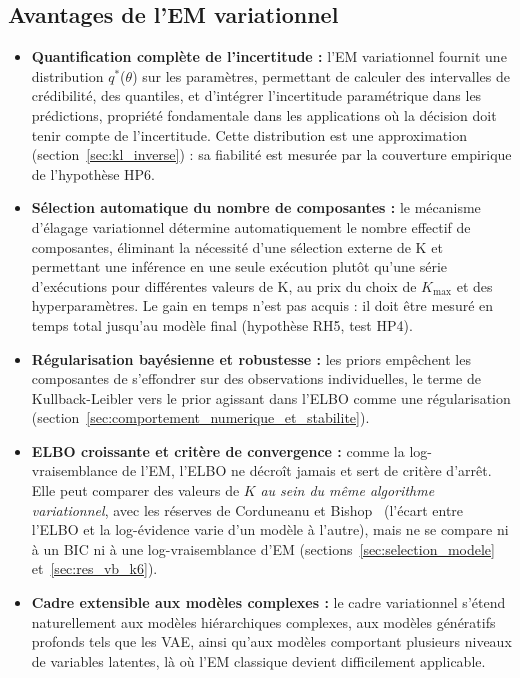 \subsection{Avantages de l'EM variationnel}\label{sec:avantages_de_l_em_variationnel}
\begin{itemize}
\item \textbf{Quantification complète de l'incertitude : }l'EM variationnel fournit une distribution $q^{*}$($\theta $) sur les paramètres, permettant de calculer des intervalles de crédibilité, des quantiles, et d'intégrer l'incertitude paramétrique dans les prédictions, propriété fondamentale dans les applications où la décision doit tenir compte de l'incertitude. Cette distribution est une approximation (section~\ref{sec:kl_inverse}) : sa fiabilité est mesurée par la couverture empirique de l'hypothèse HP6.
\item \textbf{Sélection automatique du nombre de composantes : }le mécanisme d'élagage variationnel détermine automatiquement le nombre effectif de composantes, éliminant la nécessité d'une sélection externe de K et permettant une inférence en une seule exécution plutôt qu'une série d'exécutions pour différentes valeurs de K, au prix du choix de $K_{\max}$ et des hyperparamètres. Le gain en temps n'est pas acquis : il doit être mesuré en temps total jusqu'au modèle final (hypothèse RH5, test HP4).
\item \textbf{Régularisation bayésienne et robustesse : }les priors empêchent les composantes de s'effondrer sur des observations individuelles, le terme de Kullback-Leibler vers le prior agissant dans l'ELBO comme une régularisation (section~\ref{sec:comportement_numerique_et_stabilite}).
\item \textbf{ELBO croissante et critère de convergence : }comme la log-vraisemblance de l'EM, l'ELBO ne décroît jamais et sert de critère d'arrêt. Elle peut comparer des valeurs de $K$ \emph{au sein du même algorithme variationnel}, avec les réserves de Corduneanu et Bishop~\cite{corduneanu2001} (l'écart entre l'ELBO et la log-évidence varie d'un modèle à l'autre), mais ne se compare ni à un BIC ni à une log-vraisemblance d'EM (sections~\ref{sec:selection_modele} et~\ref{sec:res_vb_k6}).
\item \textbf{Cadre extensible aux modèles complexes : }le cadre variationnel s'étend naturellement aux modèles hiérarchiques complexes, aux modèles génératifs profonds tels que les VAE, ainsi qu'aux modèles comportant plusieurs niveaux de variables latentes, là où l'EM classique devient difficilement applicable.
\end{itemize}
